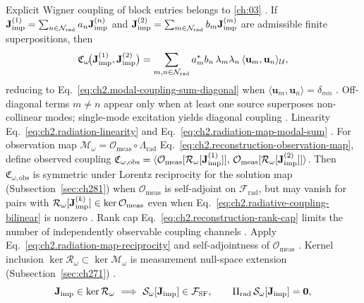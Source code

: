 Explicit Wigner coupling of block entries belongs to \ref{ch:03}
\cite{stratton1941}.
\label{prop:ch2.superposition-cross-coupling}
If \(\mathbf{J}_{\mathrm{imp}}^{(1)}=\sum_{n\in\mathcal{N}_{\mathrm{rad}}}a_n\mathbf{J}_{\mathrm{imp}}^{(n)}\) and
\(\mathbf{J}_{\mathrm{imp}}^{(2)}=\sum_{m\in\mathcal{N}_{\mathrm{rad}}}b_m\mathbf{J}_{\mathrm{imp}}^{(m)}\) are admissible finite
superpositions, then
\begin{equation}
\label{eq:ch2.superposition-coupling-expansion}
\mathfrak{C}_\omega\!\big(\mathbf{J}_{\mathrm{imp}}^{(1)},\mathbf{J}_{\mathrm{imp}}^{(2)}\big)
=
\sum_{m,n\in\mathcal{N}_{\mathrm{rad}}}
a_m^{*}b_n\,\lambda_m\lambda_n\,
\langle \mathbf{u}_m,\mathbf{u}_n\rangle_{\mathcal{U}},
\end{equation}
reducing to Eq.~\eqref{eq:ch2.modal-coupling-sum-diagonal} when \(\langle\mathbf{u}_m,\mathbf{u}_n\rangle=\delta_{mn}\)
\cite{stratton1941}. Off-diagonal terms \(m\neq n\) appear only when at least
one source superposes non-collinear modes; single-mode excitation yields diagonal coupling
\cite{jackson1999}.
Linearity Eq.~\eqref{eq:ch2.radiation-linearity} and
Eq.~\eqref{eq:ch2.radiation-map-modal-sum} \cite{stratton1941}.
\label{prop:ch2.observation-limited-coupling}
For observation map \(\mathcal{M}_\omega=\mathcal{O}_{\mathrm{meas}}\circ\Lambda_{\mathrm{rad}}\)
Eq.~\eqref{eq:ch2.reconstruction-observation-map}, define observed coupling
\(\mathfrak{C}_{\omega,\mathrm{obs}}=
\langle \mathcal{O}_{\mathrm{meas}}[\mathcal{R}_\omega[\mathbf{J}_{\mathrm{imp}}^{(1)}]],\,
\mathcal{O}_{\mathrm{meas}}[\mathcal{R}_\omega[\mathbf{J}_{\mathrm{imp}}^{(2)}]]\rangle\).
Then \(\mathfrak{C}_{\omega,\mathrm{obs}}\) is symmetric under Lorentz reciprocity for the solution map (Subsection~\ref{sec:ch281}) when \(\mathcal{O}_{\mathrm{meas}}\) is self-adjoint
on \(\mathcal{F}_{\mathrm{rad}}\), but may vanish for pairs with
\(\mathcal{R}_\omega[\mathbf{J}_{\mathrm{imp}}^{(k)}]\in\ker\mathcal{O}_{\mathrm{meas}}\) even when
Eq.~\eqref{eq:ch2.radiative-coupling-bilinear} is nonzero \cite{stratton1941}.
Rank cap Eq.~\eqref{eq:ch2.reconstruction-rank-cap} limits the number of independently
observable coupling channels \cite{stratton1941}.
Apply Eq.~\eqref{eq:ch2.radiation-map-reciprocity} and self-adjointness of
\(\mathcal{O}_{\mathrm{meas}}\) \cite{stratton1941}. Kernel inclusion
\(\ker\mathcal{R}_\omega\subset\ker\mathcal{M}_\omega\) is
measurement null-space extension (Subsection~\ref{sec:ch271}) \cite{stratton1941}.
\begin{equation}
\label{eq:ch2.kernel-field-image-law}
\mathbf{J}_{\mathrm{imp}}\in\ker\mathcal{R}_\omega
\ \Longrightarrow\
\mathcal{S}_\omega[\mathbf{J}_{\mathrm{imp}}]\in\mathcal{F}_{\mathrm{SF}},
\qquad
\Pi_{\mathrm{rad}}\,\mathcal{S}_\omega[\mathbf{J}_{\mathrm{imp}}]=\mathbf{0},
\end{equation}
